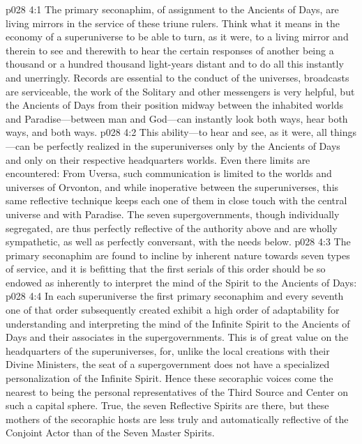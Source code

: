 \vs p028 4:1 The primary seconaphim, of assignment to the Ancients of Days, are living mirrors in the service of these triune rulers. Think what it means in the economy of a superuniverse to be able to turn, as it were, to a living mirror and therein to see and therewith to hear the certain responses of another being a thousand or a hundred thousand light\hyp{}years distant and to do all this instantly and unerringly. Records are essential to the conduct of the universes, broadcasts are serviceable, the work of the Solitary and other messengers is very helpful, but the Ancients of Days from their position midway between the inhabited worlds and Paradise---between man and God---can instantly look both ways, hear both ways, and  both ways.\plusone
\vs p028 4:2 This ability---to hear and see, as it were, all things---can be perfectly realized in the superuniverses only by the Ancients of Days and only on their respective headquarters worlds. Even there limits are encountered: From Uversa, such communication is limited to the worlds and universes of Orvonton, and while inoperative between the superuniverses, this same reflective technique keeps each one of them in close touch with the central universe and with Paradise. The seven supergovernments, though individually segregated, are thus perfectly reflective of the authority above and are wholly sympathetic, as well as perfectly conversant, with the needs below.
\pc \vs p028 4:3 The primary seconaphim are found to incline by inherent nature towards seven types of service, and it is befitting that the first serials of this order should be so endowed as inherently to interpret the mind of the Spirit to the Ancients of Days:
\pc \vs p028 4:4 \bibnobreakspace {} In each superuniverse the first primary seconaphim and every seventh one of that order subsequently created exhibit a high order of adaptability for understanding and interpreting the mind of the Infinite Spirit to the Ancients of Days and their associates in the supergovernments. This is of great value on the headquarters of the superuniverses, for, unlike the local creations with their Divine Ministers, the seat of a supergovernment does not have a specialized personalization of the Infinite Spirit. Hence these secoraphic voices come the nearest to being the personal representatives of the Third Source and Center on such a capital sphere. True, the seven Reflective Spirits are there, but these mothers of the secoraphic hosts are less truly and automatically reflective of the Conjoint Actor than of the Seven Master Spirits.
